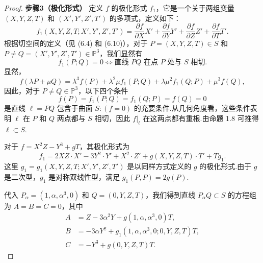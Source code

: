 \begin{proof}
\textbf{步骤3（极化形式）} 定义 \(f\) 的极化形式 \(f_1\)，它是一个关于两组变量 \((X,Y,Z,T)\) 和 \((X',Y',Z',T')\) 的多项式，定义如下：
\[
f_1(X,Y,Z,T; X',Y',Z',T') = \frac{\partial f}{\partial X} X' + \frac{\partial f}{\partial Y} Y' + \frac{\partial f}{\partial Z} Z' + \frac{\partial f}{\partial T} T'.
\]
根据切空间的定义（见 (6.4) 和 (6.10)），对于 \(P=(X,Y,Z,T) \in S\) 和 \(P \neq Q=(X',Y',Z',T') \in {\mathbb{P}}^{3}\)，我们显然有
\[
f_1(P;Q) = 0 \iff \text{直线 } PQ \text{ 在点 } P \text{ 处与 } S \text{ 相切.}
\]
显然，
\[
f(\lambda P + \mu Q) = \lambda^3 f(P) + \lambda^2\mu f_1(P;Q) + \lambda\mu^2 f_1(Q;P) + \mu^3 f(Q),
\]
因此，对于 \(P \neq Q \in {\mathbb{P}}^{3}\)，以下四个条件
\[
f(P) = f_1(P;Q) = f_1(Q;P) = f(Q) = 0
\]
是直线 \(\ell = PQ\) 包含于曲面 \(S: (f=0)\) 的充要条件.从几何角度看，这些条件表明 \(\ell\) 在 \(P\) 和 \(Q\) 两点都与 \(S\) 相切，因此 \(f|_\ell\) 在这两点都有重根.由命题 1.8 可推得 \(\ell \subset S\).

对于 \(f = X^2Z - Y^3 + gT\)，其极化形式为
\[
f_1 = 2XZ \cdot X' - 3Y^2 \cdot Y' + X^2 \cdot Z' + g(X,Y,Z,T) \cdot T' + T g_1.
\]
这里 \(g_1 = g_1(X,Y,Z,T; X',Y',Z',T')\) 是以同样方式定义的 \(g\) 的极化形式.由于 \(g\) 是二次型，\(g_1\) 是对称双线性型，满足 \(g_1(P,P) = 2g(P)\).

代入 \(P_\alpha = (1, \alpha, \alpha^3, 0)\) 和 \(Q = (0,Y,Z,T)\)，我们得到直线 \(P_\alpha Q \subset S\) 的方程组为 \(A=B=C=0\)，其中
\begin{align*}
A &= Z - 3\alpha^2 Y + g(1, \alpha, \alpha^3, 0)T, \\
B &= -3\alpha Y^2 + g_1(1, \alpha, \alpha^3, 0; 0,Y,Z,T)T, \\
C &= -Y^3 + g(0,Y,Z,T)T.
\end{align*}


\end{proof}
